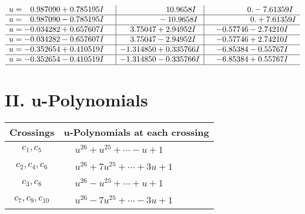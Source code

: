 \documentclass[1p]{elsarticle_modified}
\theoremstyle{definition}
\begin{document}
$$\begin{array}{c|c|c}
\begin{aligned}
u &= \phantom{-}0.987090 + 0.785195 I\end{aligned}
 & \phantom{-0.000000 -}10.9658 I & \phantom{-0.000000 } 0. - 7.61359 I \\ \hline\begin{aligned}
u &= \phantom{-}0.987090 - 0.785195 I\end{aligned}
 & \phantom{-0.000000 } -10.9658 I & \phantom{-0.000000 -}0. + 7.61359 I \\ \hline\begin{aligned}
u &= -0.034282 + 0.657607 I\end{aligned}
 & \phantom{-}3.75047 + 2.94952 I & -0.57746 - 2.74210 I \\ \hline\begin{aligned}
u &= -0.034282 - 0.657607 I\end{aligned}
 & \phantom{-}3.75047 - 2.94952 I & -0.57746 + 2.74210 I \\ \hline\begin{aligned}
u &= -0.352654 + 0.410519 I\end{aligned}
 & -1.314850 + 0.335766 I & -6.85384 - 0.55767 I \\ \hline\begin{aligned}
u &= -0.352654 - 0.410519 I\end{aligned}
 & -1.314850 - 0.335766 I & -6.85384 + 0.55767 I\\
 \hline 
 \end{array}$$\newpage
\newpage\renewcommand{\arraystretch}{1}
\centering \section*{ II. u-Polynomials}
\begin{tabular}{m{50pt}|m{274pt}}
Crossings & \hspace{64pt}u-Polynomials at each crossing \\
\hline $$\begin{aligned}c_{1},c_{5}\end{aligned}$$&$\begin{aligned}
&u^{26}+u^{25}+\cdots- u+1
\end{aligned}$\\
\hline $$\begin{aligned}c_{2},c_{4},c_{6}\end{aligned}$$&$\begin{aligned}
&u^{26}+7 u^{25}+\cdots+3 u+1
\end{aligned}$\\
\hline $$\begin{aligned}c_{3},c_{8}\end{aligned}$$&$\begin{aligned}
&u^{26}- u^{25}+\cdots+u+1
\end{aligned}$\\
\hline $$\begin{aligned}c_{7},c_{9},c_{10}\end{aligned}$$&$\begin{aligned}
&u^{26}-7 u^{25}+\cdots-3 u+1
\end{aligned}$\\
\hline
\end{tabular}\newpage\renewcommand{\arraystretch}{1}
\end{document}
